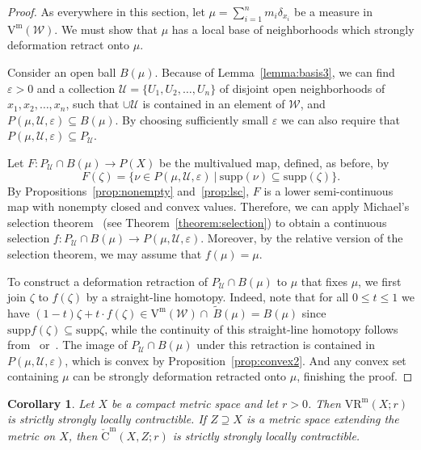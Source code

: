 \documentclass[11pt, reqno, english]{amsart}
\theoremstyle{plain}
\newtheorem{corollary}[lemma]{Corollary}
\theoremstyle{definition}
\theoremstyle{myremark}
\newcommand{\cU}{\mathcal{U}}
\newcommand{\cW}{\mathcal{W}}
\newcommand{\supp}{\mathrm{supp}}
\newcommand{\vietm}[1]{\mathrm{V}^\mathrm{m}(#1)}
\newcommand{\vrm}[2]{\mathrm{VR}^\mathrm{m}(#1;#2)}
\newcommand{\acechm}[3]{\mathrm{\check{C}}^\mathrm{m}(#1,#2;#3)}
\begin{document}
\begin{proof}
As everywhere in this section, let $\mu =\sum_{i=1}^n m_i \delta_{x_i}$ be a measure in $\vietm{\cW}$.
We must show that $\mu$ has a local base of neighborhoods which strongly deformation retract onto $\mu$.

Consider an open ball $B(\mu)$.
Because of Lemma~\ref{lemma:basis3}, we can find $\varepsilon >0$ and a collection $\cU = \{U_1, U_2, \dots, U_n\}$ of disjoint open neighborhoods of $x_1,x_2,\dots, x_n$, such that $\cup\cU$ is contained in an element of $\cW$, and $P(\mu,\cU,\varepsilon)\subseteq B(\mu)$.
By choosing sufficiently small $\varepsilon$ we can also require that $P(\mu,\cU,\varepsilon)\subseteq P_{\cU}$.

Let $F\colon P_{\cU}\cap B(\mu) \to P(X)$ be the multivalued map, defined, as before, by 
\[F(\zeta)=\{\nu\in P(\mu,\cU,\varepsilon)~|~\supp(\nu)\subseteq\supp(\zeta)\}.
\]
By Propositions~\ref{prop:nonempty} and~\ref{prop:lsc}, $F$ is a lower semi-continuous map with nonempty closed and convex values.
Therefore, we can apply Michael's selection theorem~\cite{michael1956continuous} (see Theorem~\ref{theorem:selection}) to obtain a continuous selection $f\colon P_{\cU}\cap B(\mu) \to P(\mu,\cU,\varepsilon)$.
Moreover, by the relative version of the selection theorem, we may assume that $f(\mu) = \mu$.

To construct a deformation retraction of $P_{\cU}\cap B(\mu)$ to $\mu$ that fixes $\mu$, we first join $\zeta$ to $f(\zeta)$ by a straight-line homotopy.
Indeed, note that for all $0\le t\le 1$ we have $(1-t)\zeta+t \cdot f(\zeta)\in \vietm{\cW}\cap \ \tilde{B}(\mu) = B(\mu)$ since $\supp f(\zeta)\subseteq \supp \zeta$, while the continuity of this straight-line homotopy follows from~\cite[Proposition~2.4]{AMMW} or~\cite[Lemma~3.9]{AAF}.
The image of $P_{\cU}\cap B(\mu)$ under this retraction is contained in $P(\mu,\cU,\varepsilon)$, which is convex by Proposition~\ref{prop:convex2}.
And any convex set containing $\mu$ can be strongly deformation retracted onto $\mu$, finishing the proof.
\end{proof}

\begin{corollary}
\label{cor:strong-local-contractibility}
Let $X$ be a compact metric space and let $r>0$.
Then $\vrm{X}{r}$ is strictly strongly locally contractible.
If $Z\supseteq X$ is a metric space extending the metric on $X$, then $\acechm{X}{Z}{r}$ is strictly strongly locally contractible.
\end{corollary}
\end{document}
